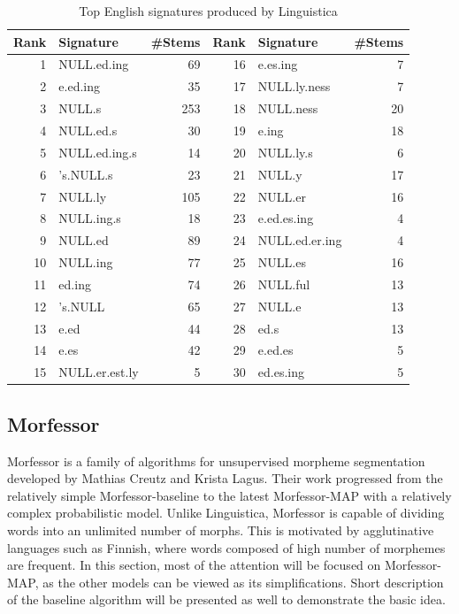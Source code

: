 \begin{table}[h]
\begin{center}
\begin{tabular}{rlrrlr}\toprule
\bf Rank     & \bf Signature & \bf  \#Stems & \bf Rank & \bf Signature & \bf \#Stems \\\midrule
1	 & 	NULL.ed.ing		& 	69	 & 16	 & 	e.es.ing	 & 	7	 \\
2	 & 	e.ed.ing		& 	35	 & 17	 & 	NULL.ly.ness	 & 	7	 \\
3	 & 	NULL.s	 		& 	253	 & 18	 & 	NULL.ness	 & 	20	 \\
4	 & 	NULL.ed.s		& 	30	 & 19	 & 	e.ing	 & 	18	 \\
5	 &  NULL.ed.ing.s	& 	14	 & 20	 & 	NULL.ly.s	 & 	6	  \\
6	 & 	's.NULL.s	 	& 	23	 & 21	 & 	NULL.y	 & 	17	 \\
7	 & 	NULL.ly	 		& 	105	 & 22	 & 	NULL.er	 & 	16	 \\
8	 & 	NULL.ing.s		& 	18	 & 23	 & 	e.ed.es.ing	 & 	4\\
9	 & 	NULL.ed			& 	89	 & 24	 & 	NULL.ed.er.ing	 & 	4\\
10	 & 	NULL.ing		& 	77	 & 25	 & 	NULL.es	 & 	16\\
11	 & 	ed.ing			& 	74	 & 26	 & 	NULL.ful	 & 	13\\
12	 & 	's.NULL			& 	65	 & 27	 & 	NULL.e	 & 	13\\
13	 & 	e.ed			& 	44	 & 28	 & 	ed.s	 & 	13\\
14	 & 	e.es			& 	42	 & 29	 & 	e.ed.es	 & 	5\\
15	 & 	NULL.er.est.ly	& 	5	 & 30	 & 	ed.es.ing	 & 	5\\\bottomrule
\end{tabular}
\end{center}
\caption{\label{table:goldsmith-signatures} Top English signatures produced by Linguistica}
\end{table}

\subsection{Morfessor}
Morfessor is a family of algorithms for unsupervised morpheme segmentation developed by Mathias Creutz and Krista Lagus. Their work progressed from the relatively simple Morfessor-baseline \citep{creutz-lagus-2002} to the latest Morfessor-MAP \citep{creutz07} with a relatively complex probabilistic model. Unlike Linguistica, Morfessor is capable of dividing words into an unlimited number of morphs. This is motivated by agglutinative languages such as Finnish, where words composed of high number of morphemes are frequent. In this section, most of the attention will be focused on Morfessor-MAP, as the other models can be viewed as its simplifications. Short description of the baseline algorithm will be presented as well to demonstrate the basic idea.

